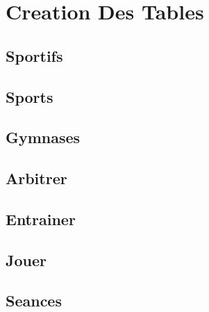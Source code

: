 \newpage
{}
\section{Creation Des Tables}
\subsection{Sportifs}


\vspace{0.25cm}

\subsection{Sports}


\vspace{0.25cm}

\subsection{Gymnases}


\vspace{0.25cm}

\subsection{Arbitrer}


\vspace{0.25cm}

\subsection{Entrainer}


\vspace{0.25cm}

\subsection{Jouer}


\vspace{0.25cm}

\subsection{Seances}


